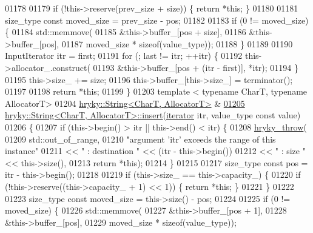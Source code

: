 \begin{DoxyCode}
01178 
01179     \textcolor{keywordflow}{if} (!this->reserve(prev\_size + size)) \{ \textcolor{keywordflow}{return} *\textcolor{keyword}{this}; \}
01180 
01181     size\_type \textcolor{keyword}{const} moved\_size = prev\_size - pos;
01182 
01183     \textcolor{keywordflow}{if} (0 != moved\_size) \{
01184         std::memmove(
01185             &this->buffer\_[pos + size],
01186             &this->buffer\_[pos],
01187             moved\_size * \textcolor{keyword}{sizeof}(value\_type));
01188     \}
01189 
01190     InputIterator itr = first;
01191     \textcolor{keywordflow}{for} (; last != itr; ++itr) \{
01192         this->allocator\_.construct(
01193             &this->buffer\_[pos + (itr - first)], *itr);
01194     \}
01195     this->size\_ += size;
01196     this->buffer\_[this->size\_] = terminator();
01197 
01198     \textcolor{keywordflow}{return} *\textcolor{keyword}{this};
01199 \}
01203 \textcolor{keyword}{template} < \textcolor{keyword}{typename} CharT, \textcolor{keyword}{typename} AllocatorT>
01204 \hyperlink{classhryky_1_1_string}{hryky::String<CharT, AllocatorT>} &
\hypertarget{string_8h_source_l01205}{}\hyperlink{classhryky_1_1_string_a62f0f7325194c1c86dfbd6af80605b90}{01205} \hyperlink{classhryky_1_1_string}{hryky::String<CharT, AllocatorT>::insert}(\hyperlink{classhryky_1_1iterator_1_1random_1_1_mutable}{iterator} itr, value\_type \textcolor{keyword}{const} value)
01206 \{
01207     \textcolor{keywordflow}{if} (this->begin() > itr || this->end() < itr) \{
01208         \hyperlink{debug__common_8h_af50606eac4009921527ddcaed392b2c2}{hryky_throw}(
01209             std::out\_of\_range,
01210             \textcolor{stringliteral}{"argument 'itr' exceeds the range of this instance"}
01211             << \textcolor{stringliteral}{" : destination "} << (itr - this->begin())
01212             << \textcolor{stringliteral}{" : size "} << this->size(),
01213             \textcolor{keywordflow}{return} *\textcolor{keyword}{this});
01214     \}
01215 
01217     size\_type \textcolor{keyword}{const} pos = itr - this->begin();
01218 
01219     \textcolor{keywordflow}{if} (this->size\_ == this->capacity\_) \{
01220         \textcolor{keywordflow}{if} (!this->reserve((this->capacity\_ + 1) << 1)) \{ \textcolor{keywordflow}{return} *\textcolor{keyword}{this}; \}
01221     \}
01222 
01223     size\_type \textcolor{keyword}{const} moved\_size = this->size() - pos;
01224 
01225     \textcolor{keywordflow}{if} (0 != moved\_size) \{
01226         std::memmove(
01227             &this->buffer\_[pos + 1],
01228             &this->buffer\_[pos],
01229             moved\_size * \textcolor{keyword}{sizeof}(value\_type));

\end{DoxyCode}
